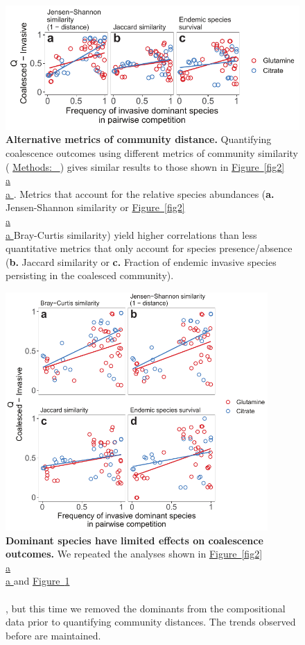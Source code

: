 \documentclass[a4paper,10pt]{article}
\newcommand{\figref}[2][]{%
  \hyperref[{#2}]{%
    Figure~\ref*{#2}%
    \ifx\\#1\\%
    \else
      #1%
    \fi
  }%
}
\newcommand{\methodsref}[1]{%
  \hyperref[{#1}]{%
   Methods:~\nameref*{#1}%
  }%
}
\begin{document}
\clearpage

\begin{figure}[!h]
\centering
\internallinenumbers
\includegraphics[width=12.5cm,keepaspectratio]{figs/figS2.pdf}
\caption{\textbf{Alternative metrics of community distance.}
Quantifying coalescence outcomes using different metrics of community similarity
(\methodsref{methods:metrics}) gives similar results to those shown in \figref[a]{fig2}.
Metrics that account for the relative species abundances (\textbf{a.} Jensen-Shannon similarity or
\figref[a]{fig2} Bray-Curtis similarity) yield higher correlations than less quantitative metrics that only
account for species presence/absence (\textbf{b.} Jaccard similarity or \textbf{c.} Fraction of endemic
invasive species persisting in the coalesced community).}
\label{figS2}
\end{figure}

\clearpage

\begin{figure}[!h]
\centering
\internallinenumbers
\includegraphics[width=10cm,keepaspectratio]{figs/figS3.pdf}
\caption{\textbf{Dominant species have limited effects on coalescence outcomes.}
We repeated the analyses shown in \figref[a]{fig2} and \figref{figS2}, but this time we removed the
dominants from the compositional data prior to quantifying community distances.
The trends observed before are maintained.}
\label{figS3}
\end{figure}
\end{document}
